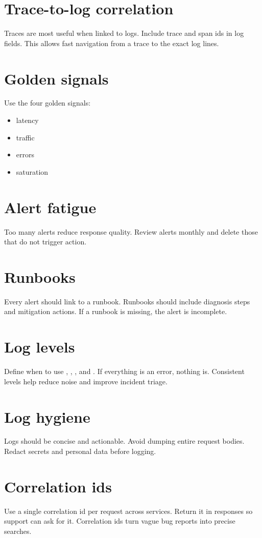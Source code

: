 \section{Trace-to-log correlation}
Traces are most useful when linked to logs.
Include trace and span ids in log fields.
This allows fast navigation from a trace to the exact log lines.

\section{Golden signals}
Use the four golden signals:
\begin{itemize}[nosep]
  \item latency
  \item traffic
  \item errors
  \item saturation
\end{itemize}

\section{Alert fatigue}
Too many alerts reduce response quality.
Review alerts monthly and delete those that do not trigger action.

\section{Runbooks}
Every alert should link to a runbook.
Runbooks should include diagnosis steps and mitigation actions.
If a runbook is missing, the alert is incomplete.

\section{Log levels}
Define when to use , , , and .
If everything is an error, nothing is.
Consistent levels help reduce noise and improve incident triage.

\section{Log hygiene}
Logs should be concise and actionable.
Avoid dumping entire request bodies.
Redact secrets and personal data before logging.

\section{Correlation ids}
Use a single correlation id per request across services.
Return it in responses so support can ask for it.
Correlation ids turn vague bug reports into precise searches.

